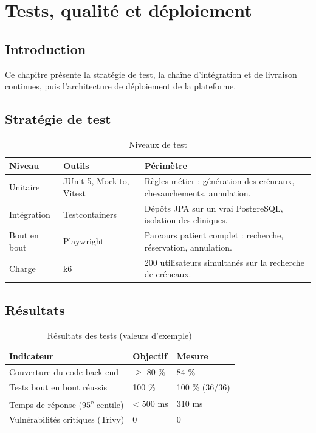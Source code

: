 \chapter{Tests, qualité et déploiement}\label{ch:tests}

\section*{Introduction}
Ce chapitre présente la stratégie de test, la chaîne d'intégration et de livraison continues, puis l'architecture de déploiement de la plateforme.

\section{Stratégie de test}
\begin{table}[H]\centering
\caption{Niveaux de test}\label{tab:tests}
\begin{tabularx}{\linewidth}{llX}
\toprule
\textbf{Niveau} & \textbf{Outils} & \textbf{Périmètre} \\
\midrule
Unitaire & JUnit 5, Mockito, Vitest & Règles métier : génération des créneaux, chevauchements, annulation. \\
Intégration & Testcontainers & Dépôts JPA sur un vrai PostgreSQL, isolation des cliniques. \\
Bout en bout & Playwright & Parcours patient complet : recherche, réservation, annulation. \\
Charge & k6 & 200 utilisateurs simultanés sur la recherche de créneaux. \\
\bottomrule
\end{tabularx}
\end{table}

\section{Résultats}
\begin{table}[H]\centering
\caption{Résultats des tests (valeurs d'exemple)}\label{tab:resultats}
\begin{tabularx}{\linewidth}{Xll}
\toprule
\textbf{Indicateur} & \textbf{Objectif} & \textbf{Mesure} \\
\midrule
Couverture du code back-end & $\geq$ 80 \% & 84 \% \\
Tests bout en bout réussis & 100 \% & 100 \% (36/36) \\
Temps de réponse (95\textsuperscript{e} centile) & < 500 ms & 310 ms \\
Vulnérabilités critiques (Trivy) & 0 & 0 \\
\bottomrule
\end{tabularx}
\end{table}

